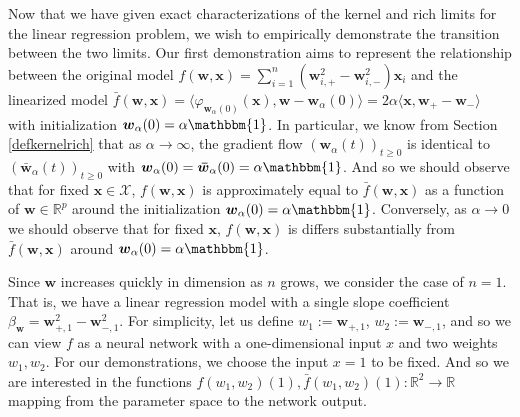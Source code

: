 \documentclass{article}
\begin{document}
Now that we have given exact characterizations of the kernel and rich limits for the linear regression problem, we wish to empirically demonstrate the transition between the two limits. Our first demonstration aims to represent the relationship between the original model $f(\boldsymbol{w}, \boldsymbol{x}) = \sum_{i=1}^n (\boldsymbol{w}_{i,+}^2 - \boldsymbol{w}_{i,-}^2)\boldsymbol{x}_i$ and the linearized model $\bar{f}(\boldsymbol{w}, \boldsymbol{x}) = \langle \varphi_{\boldsymbol{w}_{\alpha}(0)}(\boldsymbol{x}), \boldsymbol{w} - \boldsymbol{w}_{\alpha}(0) \rangle = 2\alpha \langle \boldsymbol{x} , \boldsymbol{w}_+ - \boldsymbol{w}_-\rangle$ with initialization $\boldsymbol{w}_{\alpha}(0) = \alpha \mathbbm{1}$. In particular, we know from Section \ref{defkernelrich} that as $\alpha \rightarrow \infty$, the gradient flow $(\boldsymbol{w}_{\alpha}(t))_{t \geq 0}$ is identical to $(\boldsymbol{\bar{w}}_{\alpha}(t))_{t \geq 0}$ with $\boldsymbol{w}_{\alpha}(0) = \boldsymbol{\bar{w}}_{\alpha}(0) = \alpha \mathbbm{1}$. And so we should observe that for fixed $\boldsymbol{x} \in \mathcal{X}$, $f(\boldsymbol{w}, \boldsymbol{x})$ is approximately equal to $\bar{f}(\boldsymbol{w}, \boldsymbol{x})$ as a function of $\boldsymbol{w} \in \mathbb{R}^p$ around the initialization $\boldsymbol{w}_{\alpha}(0) = \alpha \mathbbm{1}$. Conversely, as $\alpha \rightarrow 0$ we should observe that for fixed $\boldsymbol{x}$, $f(\boldsymbol{w}, \boldsymbol{x})$ is differs substantially from $\bar{f}(\boldsymbol{w}, \boldsymbol{x})$ around $\boldsymbol{w}_{\alpha}(0) = \alpha \mathbbm{1}$.

Since $\boldsymbol{w}$ increases quickly in dimension as $n$ grows, we consider the case of $n =1$. That is, we have a linear regression model with a single slope coefficient $\beta_{\boldsymbol{w}} = \boldsymbol{w}_{+, 1}^2 - \boldsymbol{w}_{-, 1}^2$. For simplicity, let us define $w_1 := \boldsymbol{w}_{+, 1}$, $w_2 := \boldsymbol{w}_{-, 1}$, and so we can view $f$ as a neural network with a one-dimensional input $x$ and two weights $w_1, w_2$. For our demonstrations, we choose the input $x = 1$ to be fixed. And so we are interested in the functions $f(w_1, w_2)(1), \bar{f}(w_1, w_2)(1): \mathbb{R}^2 \rightarrow \mathbb{R}$ mapping from the parameter space to the network output.
\end{document}
